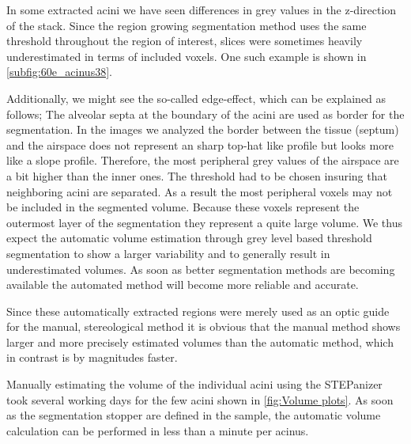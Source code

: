 \documentclass[paper=a4,DIV=calc,abstract,english]{scrartcl}
\begin{document}
In some extracted acini we have seen differences in grey values in the z-direction of the stack.
Since the region growing segmentation method uses the same threshold throughout the region of interest, slices were sometimes heavily underestimated in terms of included voxels. One such example is shown in \autoref{subfig:60e_acinus38}.

Additionally, we might see the so-called edge-effect, which can be explained as follows; 
The alveolar septa at the boundary of the acini are used as border for the segmentation.
In the images we analyzed the border between the tissue (septum) and the airspace does not represent an sharp top-hat like profile but looks more like a slope profile.
Therefore, the most peripheral grey values of the airspace are a bit higher than the inner ones.
The threshold had to be chosen insuring that neighboring acini are separated.
As a result the most peripheral voxels may not be included in the segmented volume.
Because these voxels represent the outermost layer of the segmentation they represent a quite large volume.
We thus expect the automatic volume estimation through grey level based threshold segmentation to show a larger variability and to generally result in underestimated volumes.
As soon as better segmentation methods are becoming available the automated method will become more reliable and accurate.

Since these automatically extracted regions were merely used as an optic guide for the manual, stereological method it is obvious that the manual method shows larger and more precisely estimated volumes than the automatic method, which in contrast is by magnitudes faster.

Manually estimating the volume of the individual acini using the STEPanizer took several working days for the few acini shown in \autoref{fig:Volume plots}.
As soon as the segmentation stopper are defined in the sample, the automatic volume calculation can be performed in less than a minute per acinus.
\end{document}

